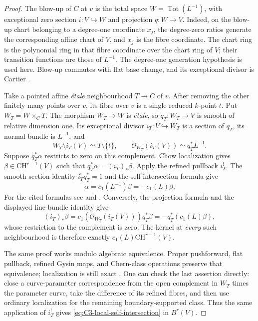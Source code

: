 \begin{proof}
The blow-up of $C$ at $v$ is the total space
$W=\operatorname{Tot}(L^{-1})$, with exceptional zero section
$i:V\hookrightarrow W$ and projection $q:W\to V$.
Indeed, on the blow-up chart belonging to a degree-one coordinate
$x_j$, the degree-zero ratios generate the corresponding affine
chart of $V$, and $x_j$ is the fibre coordinate. The chart ring is
the polynomial ring in that fibre coordinate over the chart ring
of $V$; their transition functions are those of $L^{-1}$.
The degree-one generation hypothesis is used here.
Blow-up commutes with flat base change, and its exceptional divisor
is Cartier \citep[Lemmas 31.33.3--31.33.4]{rootStacksBlowup}.

Take a pointed affine \emph{\'etale} neighbourhood $T\to C$ of $v$.
After removing the other finitely many points over $v$, its fibre over
$v$ is a single reduced $k$-point $t$. Put $W_T=W\times_C T$.
The morphism $W_T\to W$ is \emph{\'etale}, so
$q_T:W_T\to V$ is smooth of relative dimension one. Its exceptional
divisor $i_T:V\hookrightarrow W_T$ is a section of $q_T$, its normal
bundle is $L^{-1}$, and
\[
 W_T\setminus i_T(V)\simeq T\setminus\{t\},\qquad
 \mathcal O_{W_T}(i_T(V))\simeq q_T^*L^{-1}.
\]
Suppose $q_T^*\alpha$ restricts to zero on this complement.
Chow localization gives $\beta\in\mathrm{CH}^{r-1}(V)$ such that
$q_T^*\alpha=(i_T)_*\beta$. Apply the refined pullback $i_T^!$.
The smooth-section identity $i_T^!q_T^*=1$ and the
self-intersection formula give
\begin{equation}\label{eq:C3-local-self-intersection}
          \alpha=c_1(L^{-1})\beta=-c_1(L)\beta.
\end{equation}
For the cited formulas see \citet[Lemma 42.59.2]{rootStacksGysin}
and \citet[Proposition 1.8 and Corollary 6.3]{frC4Fulton1998}.
Conversely, the projection formula and the displayed line-bundle
identity give
\[
 (i_T)_*\beta
  =c_1(\mathcal O_{W_T}(i_T(V)))q_T^*\beta
  =-q_T^*(c_1(L)\beta),
\]
whose restriction to the complement is zero. The kernel at
\emph{every} such neighbourhood is therefore exactly
$c_1(L)\mathrm{CH}^{r-1}(V)$.

The same proof works modulo algebraic equivalence. Proper pushforward,
flat pullback, refined Gysin maps, and Chern-class operations preserve
that equivalence; localization is still exact
\citep[Proposition 10.3 and Example 10.3.4]{frC4Fulton1998}.
One can check the last assertion directly: close a curve-parameter
correspondence from the open complement in $W_T$ times the parameter
curve, take the difference of its refined fibres, and then use
ordinary localization for the remaining boundary-supported class.
Thus the same application of $i_T^!$ gives
\eqref{eq:C3-local-self-intersection} in $B^r(V)$.


\end{proof}
